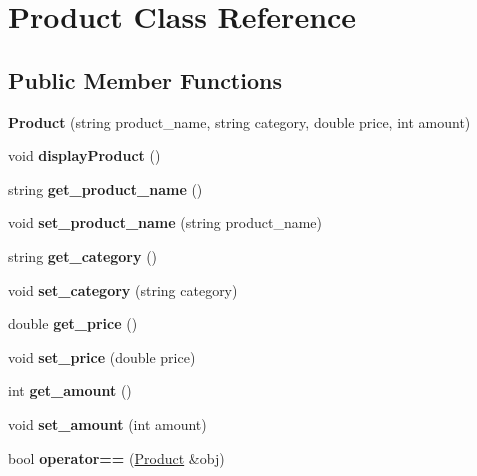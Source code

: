 \hypertarget{class_product}{}\section{Product Class Reference}
\label{class_product}
\subsection*{Public Member Functions}
\begin{DoxyCompactItemize}
\item 
\mbox{\label{class_product_a9a8cdf5088bfb564bfcede52ab240152}} 
{\bfseries Product} (string product\+\_\+name, string category, double price, int amount)
\item 
\mbox{\label{class_product_abf49afaa9cbb5feba6104434c4092fc0}} 
void {\bfseries display\+Product} ()
\item 
\mbox{\label{class_product_a23ab3e0728d0d706db6e36c1a14724f7}} 
string {\bfseries get\+\_\+product\+\_\+name} ()
\item 
\mbox{\label{class_product_acf88da4625579cea22785c9a34052aa0}} 
void {\bfseries set\+\_\+product\+\_\+name} (string product\+\_\+name)
\item 
\mbox{\label{class_product_ae8c8973a1565b81b0874e724c44116da}} 
string {\bfseries get\+\_\+category} ()
\item 
\mbox{\label{class_product_a7f0b82d1f3ee2c46c69c5c7903e12400}} 
void {\bfseries set\+\_\+category} (string category)
\item 
\mbox{\label{class_product_ae83c8f49770a528daa17e5cc27c473e3}} 
double {\bfseries get\+\_\+price} ()
\item 
\mbox{\label{class_product_a83f48e73ee9dfa716a864d316ad13b42}} 
void {\bfseries set\+\_\+price} (double price)
\item 
\mbox{\label{class_product_ae84c2108928c2b422248b1120a5b2e07}} 
int {\bfseries get\+\_\+amount} ()
\item 
\mbox{\label{class_product_a8149750b2c12563ebeb7e8ebdaf728ba}} 
void {\bfseries set\+\_\+amount} (int amount)
\item 
\mbox{\label{class_product_a7dead85ab9565147101d963dd002a137}} 
bool {\bfseries operator==} (\hyperlink{class_product}{Product} \&obj)
\end{DoxyCompactItemize}
